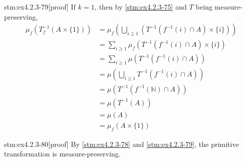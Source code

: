 \begin{stm}{stm:ex4.2.3-79}[proof]
If $k = 1$, then by \ref{stm:ex4.2.3-75} and $T$ being measure-preserving,
\begin{align*}
\mu_f(T_f^{-1}(A \times \{1\})) &= \mu_f\left(\bigcup_{i \ge 1} (T^{-1}(f^{-1}(i) \cap A) \times \{i\})\right) \\
&= \sum_{i \ge 1} \mu_f(T^{-1}(f^{-1}(i) \cap A) \times \{i\}) \\
&= \sum_{i \ge 1} \mu(T^{-1}(f^{-1}(i) \cap A)) \\
&= \mu\left(\bigcup_{i \ge 1} T^{-1}(f^{-1}(i) \cap A)\right) \\
&= \mu(T^{-1}(f^{-1}(\mathbb{N}) \cap A)) \\
&= \mu(T^{-1}(A)) \\
&= \mu(A) \\
&= \mu_f(A \times \{1\})
\end{align*}
\end{stm}


\begin{stm}{stm:ex4.2.3-80}[proof]
By \ref{stm:ex4.2.3-78} and \ref{stm:ex4.2.3-79}, the primitive transformation is measure-preserving.
\end{stm}